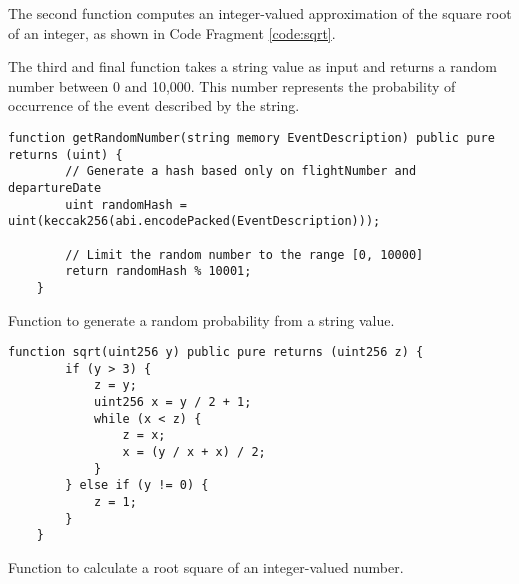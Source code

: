 \documentclass[10pt]{article}
\begin{document}
The second function computes an integer-valued approximation of the square root of an integer, as shown in Code Fragment \ref{code:sqrt}.

The third and final function takes a string value as input and returns a random number between 0 and 10,000. This number represents the probability of occurrence of the event described by the string.

\begin{codefragment}[!h]
\begin{lstlisting}[language=Solidity]
    function getRandomNumber(string memory EventDescription) public pure returns (uint) {
        // Generate a hash based only on flightNumber and departureDate
        uint randomHash = uint(keccak256(abi.encodePacked(EventDescription)));
        
        // Limit the random number to the range [0, 10000]
        return randomHash % 10001;
    }
    \end{lstlisting}
    \caption{Function to generate a random probability from a string value.}
    \label{code:getRandomNumber}
\end{codefragment}

\begin{codefragment}[!h]
\begin{lstlisting}[language=Solidity]
    function sqrt(uint256 y) public pure returns (uint256 z) {
        if (y > 3) {
            z = y;
            uint256 x = y / 2 + 1;
            while (x < z) {
                z = x;
                x = (y / x + x) / 2;
            }
        } else if (y != 0) {
            z = 1;
        }
    }
    \end{lstlisting}
    \caption{Function to calculate a root square of an integer-valued number.}
    \label{code:sqrt}
\end{codefragment}







\end{document}
